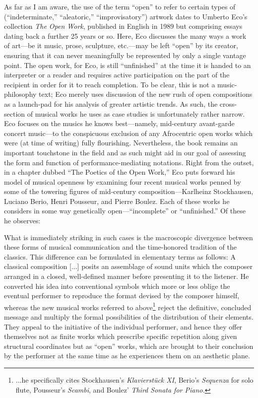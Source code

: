     As far as I am aware, the use of the term ``open'' to refer to certain types of (``indeterminate,'' ``aleatoric,'' ``improvisatory'') artwork dates to Umberto Eco's collection \textit{The Open Work}, published in English in 1989 but comprising essays dating back a further 25 years or so. Here, Eco discusses the many ways a work of art---be it music, prose, sculpture, etc.---may be left ``open'' by its creator, ensuring that it can never meaningfully be represented by only a single vantage point. The open work, for Eco, is still ``unfinished'' at the time it is handed to an interpreter or a reader and requires active participation on the part of the recipient in order for it to reach completion. To be clear, this is not a music-philosophy text; Eco merely uses discussion of the new rush of open compositions as a launch-pad for his analysis of greater artistic trends. As such, the cross-section of musical works he uses as case studies is unfortunately rather narrow. Eco focuses on the musics he knows best---namely, mid-century avant-garde concert music---to the conspicuous exclusion of any Afrocentric open works which were (at time of writing) fully flourishing. Nevertheless, the book remains an important touchstone in the field and as such might aid in our goal of assessing the form and function of performance-mediating notations. Right from the outset, in a chapter dubbed ``The Poetics of the Open Work,'' Eco puts forward his model of musical openness by examining four recent musical works penned by some of the towering figures of mid-century composition---Karlheinz Stockhausen, Luciano Berio, Henri Pousseur, and Pierre Boulez. Each of these works he considers in some way genetically open---``incomplete'' or ``unfinished.'' Of these he observes:

        \begin{smallquote}
            What is immediately striking in such cases is the macroscopic divergence between these forms of musical communication and the time-honored tradition of the classics. This difference can be formulated in elementary terms as follows: A classical composition [...] posits an assemblage of sound units which the composer arranged in a closed, well-defined manner before presenting it to the listener. He converted his idea into conventional symbols which more or less oblige the eventual performer to reproduce the format devised by the composer himself, whereas the new musical works referred to above\footnote{...he specifically cites Stockhausen's \textit{Klavierstück XI}, Berio's \textit{Sequenza} for solo flute, Pousseur's \textit{Scambi}, and Boulez' \textit{Third Sonata for Piano.}} reject the definitive, concluded message and multiply the formal possibilities of the distribution of their elements. They appeal to the initiative of the individual performer, and hence they offer themselves not as finite works which prescribe specific repetition along given structural coordinates but as ``open'' works, which are brought to their conclusion by the performer at the same time as he experiences them on an aesthetic plane.\autocite[2-3]{Eco_Robey_1989}
        \end{smallquote}

